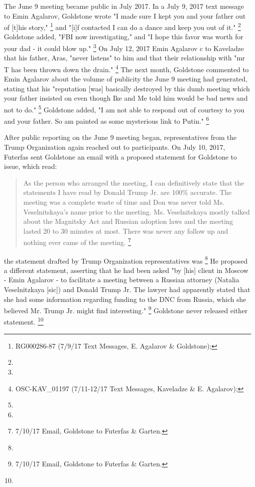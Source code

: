 The June 9 meeting became public in July 2017.
In a July 9, 2017 text message to Emin Agalarov, Goldstone wrote "I made sure I kept you and your father out of [t]his story,"%
\footnote{RG000286-87 (7/9/17 Text Messages, E. Agalarov & Goldstone); }
and "[i]f contacted I can do a dance and keep you out of it."%
\footnote{}
Goldstone added, "FBI now investigating," and "I hope this favor was worth for your dad - it could blow up."%
\footnote{ }
On July 12, 2017 Emin Agalarov c to Kaveladze that his father, Aras, "never listens" to him and that their relationship with "mr T has been thrown down the drain."%
\footnote{OSC-KAV\_01197 (7/11-12/17 Text Messages, Kaveladze \& E. Agalarov); }
The next month, Goldstone commented to Emin Agalarov about the volume of publicity the June 9 meeting had generated, stating that his "reputation [was] basically destroyed by this dumb meeting which your father insisted on even though Ike and Me told him would be bad news and not to do."%
\footnote{}
Goldstone added, "I am not able to respond out of courtesy to you and your father.
So am painted as some mysterious link to Putin."%
\footnote{}

After public reporting on the June 9 meeting began, representatives from the Trump Organization again reached out to participants.
On July 10, 2017, Futerfas sent Goldstone an email with a proposed statement for Goldstone to issue, which read:

\begin{quote}
As the person who arranged the meeting, I can definitively state that the statements I have read by Donald Trump Jr. are 100\% accurate.
The meeting was a complete waste of time and Don was never told Ms. Veselnitskaya's name prior to the meeting.
Ms. Veselnitskaya mostly talked about the Magnitsky Act and Russian adoption laws and the meeting lasted 20 to 30 minutes at most.
There was never any follow up and nothing ever came of the meeting.%
\footnote{7/10/17 Email, Goldstone to Futerfas \& Garten.}
\end{quote}

the statement drafted by Trump Organization representatives was
\footnote{}
He proposed a different statement, asserting that he had been asked "by [his] client in Moscow - Emin Agalarov - to facilitate a meeting between a Russian attorney (Natalia Veselnitzkaya [sic]) and Donald Trump Jr.
The lawyer had apparently stated that she had some information regarding funding to the DNC from Russia, which she believed Mr. Trump Jr. might find interesting."%
\footnote{7/10/17 Email, Goldstone to Futerfas \& Garten.}
Goldstone never released either statement.%
\footnote{}

